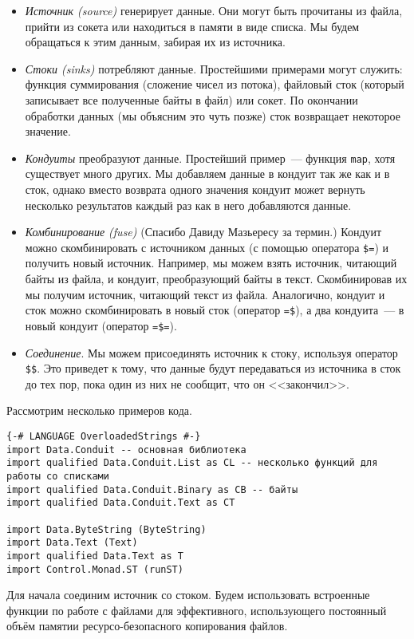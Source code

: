 \begin{itemize}
 \item \emph{Источник (source)} генерирует данные. Они могут быть прочитаны из файла, прийти из
сокета или находиться в памяти в виде списка. Мы будем обращаться к этим данным, забирая их из
источника.

 \item \emph{Стоки (sinks)} потребляют данные. 
 Простейшими примерами могут служить: функция суммирования (сложение чисел из потока), файловый сток (который записывает все полученные байты в файл) или сокет.
По окончании обработки данных (мы объясним это чуть позже) сток возвращает некоторое значение.

 \item \emph{Кондуиты} преобразуют данные. Простейший пример~--- функция
\lstinline=map=,
хотя существует много других. Мы добавляем данные в кондуит так же как и в сток, однако вместо
возврата одного значения кондуит может вернуть несколько результатов каждый раз
как в него добавляются данные.

  \item \emph{Комбинирование (fuse)} (Спасибо Давиду Мазьересу за термин.) Кондуит можно 
скомбинировать с источником данных (с помощью оператора \lstinline!$=!) и получить
новый источник. Например, мы можем взять источник, читающий байты из файла, и
кондуит, преобразующий байты в текст. Скомбинировав их мы получим 
источник, читающий текст из файла. Аналогично, кондуит и сток можно скомбинировать в новый сток
(оператор \verb#=$#), а два кондуита~--- в новый кондуит (оператор \verb#=$=#).

  \item \emph{Соединение}. Мы можем присоединять источник к стоку, используя оператор
\verb=$$=.
Это приведет к тому, что данные будут передаваться из источника в сток до тех пор, пока
один из них не сообщит, что он <<закончил>>.
\end{itemize}

Рассмотрим несколько примеров кода.
\begin{lstlisting}
{-# LANGUAGE OverloadedStrings #-}
import Data.Conduit -- основная библиотека
import qualified Data.Conduit.List as CL -- несколько функций для работы со списками
import qualified Data.Conduit.Binary as CB -- байты
import qualified Data.Conduit.Text as CT

import Data.ByteString (ByteString)
import Data.Text (Text)
import qualified Data.Text as T
import Control.Monad.ST (runST)
\end{lstlisting}
Для начала соединим источник со стоком. Будем использовать встроенные 
функции по работе с файлами для эффективного, использующего постоянный объём памятии ресурсо-безопасного копирования файлов.

